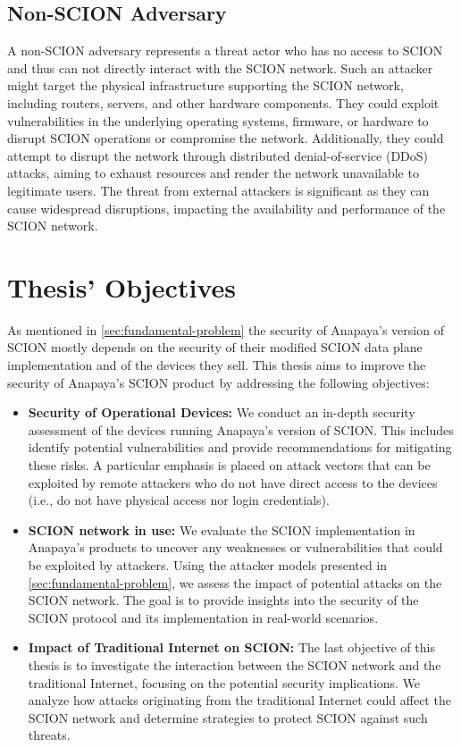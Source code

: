 \subsection{Non-SCION Adversary}
A non-SCION adversary represents a threat actor who has no access to SCION and thus can not directly interact with the SCION network.
Such an attacker might target the physical infrastructure supporting the SCION network, including routers, servers, and other hardware components.
They could exploit vulnerabilities in the underlying operating systems, firmware, or hardware to disrupt SCION operations or compromise the network.
Additionally, they could attempt to disrupt the network through distributed denial-of-service (DDoS) attacks, aiming to exhaust resources and render the network unavailable to legitimate users.
The threat from external attackers is significant as they can cause widespread disruptions, impacting the availability and performance of the SCION network.



\section{Thesis' Objectives}
As mentioned in \cref{sec:fundamental-problem} the security of Anapaya's version of SCION mostly depends on the security of their modified SCION data plane implementation and of the devices they sell.
This thesis aims to improve the security of Anapaya's SCION product by addressing the following objectives:

\begin{itemize}
        \item \textbf{Security of Operational Devices:}
        We conduct an in-depth security assessment of the devices running Anapaya's version of SCION.
        This includes identify potential vulnerabilities and provide recommendations for mitigating these risks.
        A particular emphasis is placed on attack vectors that can be exploited by remote attackers who do not have direct access to the devices (i.e., do not have physical access nor login credentials).

        \item \textbf{SCION network in use:}
        We evaluate the SCION implementation in Anapaya's products to uncover any weaknesses or vulnerabilities that could be exploited by attackers.
        Using the attacker models presented in \cref{sec:fundamental-problem}, we assess the impact of potential attacks on the SCION network.
        The goal is to provide insights into the security of the SCION protocol and its implementation in real-world scenarios.

        \item \textbf{Impact of Traditional Internet on SCION:}
        The last objective of this thesis is to investigate the interaction between the SCION network and the traditional Internet, focusing on the potential security implications.
        We analyze how attacks originating from the traditional Internet could affect the SCION network and determine strategies to protect SCION against such threats.
\end{itemize}



